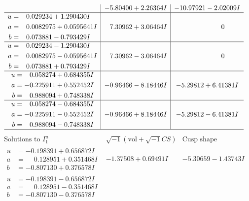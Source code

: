 \documentclass[1p]{elsarticle_modified}
\theoremstyle{definition}
\newcommand{\I}{\sqrt{-1}}
\begin{document}
$$\begin{array}{c|c|c}
 & -5.80400 + 2.26364 I & -10.97921 - 2.02009 I \\ \hline\begin{aligned}
u &= \phantom{-}0.029234 + 1.290430 I \\
a &= \phantom{-}0.0082975 + 0.0595641 I \\
b &= \phantom{-}0.073881 - 0.793429 I\end{aligned}
 & \phantom{-}7.30962 + 3.06464 I & \phantom{-0.000000 } 0 \\ \hline\begin{aligned}
u &= \phantom{-}0.029234 - 1.290430 I \\
a &= \phantom{-}0.0082975 - 0.0595641 I \\
b &= \phantom{-}0.073881 + 0.793429 I\end{aligned}
 & \phantom{-}7.30962 - 3.06464 I & \phantom{-0.000000 } 0 \\ \hline\begin{aligned}
u &= \phantom{-}0.058274 + 0.684355 I \\
a &= -0.225911 + 0.552452 I \\
b &= \phantom{-}0.988094 + 0.748338 I\end{aligned}
 & -0.96466 - 8.18446 I & -5.29812 + 6.41381 I \\ \hline\begin{aligned}
u &= \phantom{-}0.058274 - 0.684355 I \\
a &= -0.225911 - 0.552452 I \\
b &= \phantom{-}0.988094 - 0.748338 I\end{aligned}
 & -0.96466 + 8.18446 I & -5.29812 - 6.41381 I\\
 \hline 
 \end{array}$$\newpage$$\begin{array}{c|c|c}  
\text{Solutions to }I^u_{1}& \I (\text{vol} + \sqrt{-1}CS) & \text{Cusp shape}\\
 \hline 
\begin{aligned}
u &= -0.198391 + 0.656872 I \\
a &= \phantom{-}0.128951 + 0.351468 I \\
b &= -0.807130 + 0.376578 I\end{aligned}
 & -1.37508 + 0.69491 I & -5.30659 - 1.43743 I \\ \hline\begin{aligned}
u &= -0.198391 - 0.656872 I \\
a &= \phantom{-}0.128951 - 0.351468 I \\
b &= -0.807130 - 0.376578 I\end{aligned}

\end{array}$$
\end{document}
